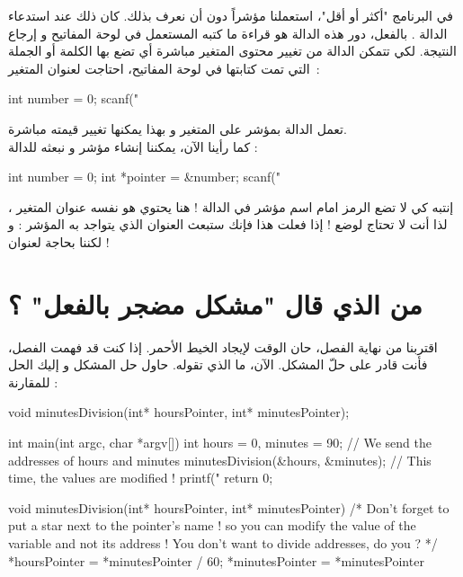 في البرنامج "أكثر أو أقل"، استعملنا مؤشراً دون أن نعرف بذلك. كان ذلك عند استدعاء الدالة
.
بالفعل، دور هذه الدالة هو قراءة ما كتبه المستعمل في لوحة المفاتيح و إرجاع النتيجة. لكي تتمكن الدالة من تغيير محتوى المتغير مباشرة أي تضع بها الكلمة أو الجملة التي تمت كتابتها في لوحة المفاتيح، احتاجت لعنوان المتغير~:

\begin{Csource}
int number = 0;
scanf("%
\end{Csource}

تعمل الدالة بمؤشر على المتغير
و بهذا يمكنها تغيير قيمته مباشرة.\\
كما رأينا الآن، يمكننا إنشاء مؤشر و نبعثه للدالة
 :

\begin{Csource}
int number = 0;
int *pointer = &number;
scanf("%
\end{Csource}

إنتبه كي لا تضع الرمز
\InlineCode{\&}
امام اسم مؤشر في الدالة
 !
هنا
يحتوي هو نفسه عنوان المتغير
،
لذا أنت لا تحتاج لوضع
\InlineCode{\&} !
إذا فعلت هذا فإنك ستبعث العنوان الذي يتواجد به المؤشر : و لكننا بحاجة لعنوان
 !

\section{من الذي قال "مشكل مضجر بالفعل" ؟}

اقتربنا من نهاية الفصل، حان الوقت لإيجاد الخيط الأحمر. إذا كنت قد فهمت الفصل، فأنت قادر على حلّ المشكل. الآن، ما الذي تقوله. حاول حل المشكل و إليك الحل للمقارنة :

\begin{Csource}
void minutesDivision(int* hoursPointer, int* minutesPointer);

int main(int argc, char *argv[])
{
	int hours = 0, minutes = 90;
	// We send the addresses of hours and minutes
	minutesDivision(&hours, &minutes);
	// This time, the values are modified !
	printf("%
	return 0;
}

void minutesDivision(int* hoursPointer, int* minutesPointer)
{
	/* Don't forget to put a star next to the pointer's name ! so you can modify the value of the variable and not its address ! You don't want to divide addresses, do you ? */
	*hoursPointer = *minutesPointer / 60;
	*minutesPointer = *minutesPointer %
}
\end{Csource}

